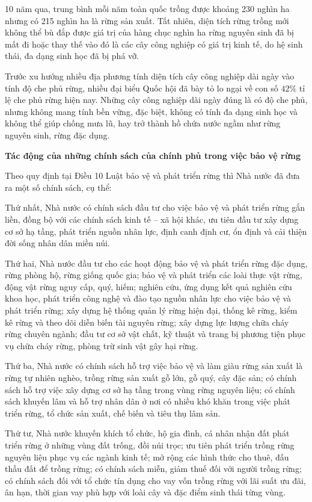 \begin{enumerate}[label=\bfseries Câu \arabic*:]
{		10 năm qua, trung bình mỗi năm toàn quốc trồng được khoảng 230 nghìn ha nhưng có 215 nghìn ha là rừng sản xuất. Tất nhiên, diện tích rừng trồng mới không thể bù đắp được giá trị của hàng chục nghìn ha rừng nguyên sinh đã bị mất đi hoặc thay thế vào đó là các cây công nghiệp có giá trị kinh tế, do hệ sinh thái, đa dạng sinh học đã bị phá vỡ.
		
		Trước xu hướng nhiều địa phương tính diện tích cây công nghiệp dài ngày vào tính độ che phủ rừng, nhiều đại biểu Quốc hội đã bày tỏ lo ngại về con số $42\%$ tỉ lệ che phủ rừng hiện nay. Những cây công nghiệp dài ngày đúng là có độ che phủ, nhưng không mang tính bền vững, đặc biệt, không có tính đa dạng sinh học và không thể giúp chống mưa lũ, hay trở thành hồ chứa nước ngầm như rừng nguyên sinh, rừng đặc dụng.
		
		\textbf{Tác động của những chính sách của chính phủ trong việc bảo vệ rừng}
		
		Theo quy định tại Điều 10 Luật bảo vệ và phát triển rừng thì Nhà nước đã đưa ra một số chính sách, cụ thể:
		
		Thứ nhất, Nhà nước có chính sách đầu tư cho việc bảo vệ và phát triển rừng gắn liền, đồng bộ với các chính sách kinh tế – xã hội khác, ưu tiên đầu tư xây dựng cơ sở hạ tầng, phát triển nguồn nhân lực, định canh định cư, ổn định và cải thiện đời sống nhân dân miền núi.
		
		Thứ hai, Nhà nước đầu tư cho các hoạt động bảo vệ và phát triển rừng đặc dụng, rừng phòng hộ, rừng giống quốc gia; bảo vệ và phát triển các loài thực vật rừng, động vật rừng nguy cấp, quý, hiếm; nghiên cứu, ứng dụng kết quả nghiên cứu khoa học, phát triển công nghệ và đào tạo nguồn nhân lực cho việc bảo vệ và phát triển rừng; xây dựng hệ thống quản lý rừng hiện đại, thống kê rừng, kiểm kê rừng và theo dõi diễn biến tài nguyên rừng; xây dựng lực lượng chữa cháy rừng chuyên ngành; đầu tư cơ sở vật chất, kỹ thuật và trang bị phương tiện phục vụ chữa cháy rừng, phòng trừ sinh vật gây hại rừng.
		
		Thứ ba, Nhà nước có chính sách hỗ trợ việc bảo vệ và làm giàu rừng sản xuất là rừng tự nhiên nghèo, trồng rừng sản xuất gỗ lớn, gỗ quý, cây đặc sản; có chính sách hỗ trợ việc xây dựng cơ sở hạ tầng trong vùng rừng nguyên liệu; có chính sách khuyến lâm và hỗ trợ nhân dân ở nơi có nhiều khó khăn trong việc phát triển rừng, tổ chức sản xuất, chế biến và tiêu thụ lâm sản.
		
		
		
		Thứ tư, Nhà nước khuyến khích tổ chức, hộ gia đình, cá nhân nhận đất phát triển rừng ở những vùng đất trống, đồi núi trọc; ưu tiên phát triển trồng rừng nguyên liệu phục vụ các ngành kinh tế; mở rộng các hình thức cho thuê, đấu thầu đất để trồng rừng; có chính sách miễn, giảm thuế đối với người trồng rừng; có chính sách đối với tổ chức tín dụng cho vay vốn trồng rừng với lãi suất ưu đãi, ân hạn, thời gian vay phù hợp với loài cây và đặc điểm sinh thái từng vùng.
		
}
\end{enumerate}
